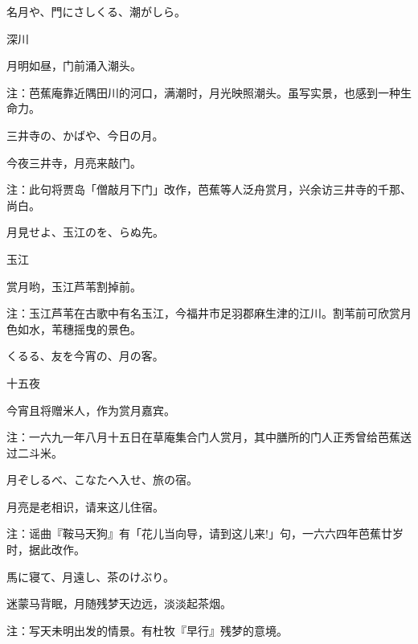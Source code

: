 \begin{haiku}
    {\FH 名月や、門にさしくる、潮がしら。}

    {\FK 深川}

    {\FK 月明如昼，门前涌入潮头。}

    {\FT 注：芭蕉庵靠近隅田川的河口，满潮时，月光映照潮头。虽写实景，也感到一种生命力。}
\end{haiku}

\begin{haiku}
    {\FH 三井寺の、かばや、今日の月。}

    {\FK 今夜三井寺，月亮来敲门。}

    {\FT 注：此句将贾岛「僧敲月下门」改作，芭蕉等人泛舟赏月，兴余访三井寺的千那、尚白。}
\end{haiku}

\begin{haiku}
    {\FH 月見せよ、玉江のを、らぬ先。}

    {\FK 玉江}

    {\FK 赏月哟，玉江芦苇割掉前。}

    {\FT 注：玉江芦苇在古歌中有名玉江，今福井市足羽郡麻生津的江川。割苇前可欣赏月色如水，苇穗摇曳的景色。}
\end{haiku}

\begin{haiku}
    {\FH {}くるる、友を今宵の、月の客。}

    {\FK 十五夜}

    {\FK 今宵且将赠米人，作为赏月嘉宾。}

    {\FT 注：一六九一年八月十五日在草庵集合门人赏月，其中膳所的门人正秀曾给芭蕉送过二斗米。}
\end{haiku}

\begin{haiku}
    {\FH 月ぞしるべ、こなたへ入せ、旅の宿。}

    {\FK 月亮是老相识，请来这儿住宿。}

    {\FT 注：谣曲『鞍马天狗』有「花儿当向导，请到这儿来!」句，一六六四年芭蕉廿岁时，据此改作。}
\end{haiku}

\begin{haiku}
    {\FH 馬に寝て、月遠し、茶のけぶり。}

    {\FK 迷蒙马背眠，月随残梦天边远，淡淡起茶烟。}

    {\FT 注：写天未明出发的情景。有杜牧『早行』残梦的意境。}
\end{haiku}

